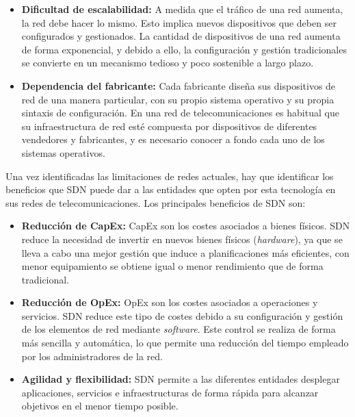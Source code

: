 \begin{itemize}
	\item \textbf{Dificultad de escalabilidad:} A medida que el tráfico de una red aumenta, la red debe hacer lo mismo. Esto implica nuevos dispositivos que deben ser configurados y gestionados. La cantidad de dispositivos de una red aumenta de forma exponencial, y debido a ello, la configuración y gestión tradicionales se convierte en un mecanismo tedioso y poco sostenible a largo plazo.
	
	\item \textbf{Dependencia del fabricante:} Cada fabricante diseña sus dispositivos de red de una manera particular, con su propio sistema operativo y su propia sintaxis de configuración. En una red de telecomunicaciones es habitual que su infraestructura de red esté compuesta por dispositivos de diferentes vendedores y fabricantes, y es necesario conocer a fondo cada uno de los sistemas operativos.
	
\end{itemize}

Una vez identificadas las limitaciones de redes actuales, hay que identificar los beneficios que SDN puede dar a las entidades que opten por esta tecnología en sus redes de telecomunicaciones. Los principales beneficios de \ac{SDN} son:

\begin{itemize}
	\item \textbf{Reducción de \ac{CapEx}:} \ac{CapEx} son los costes asociados a bienes físicos. SDN reduce la necesidad de invertir en nuevos bienes físicos (\textit{hardware}), ya que se lleva a cabo una mejor gestión que induce a planificaciones más eficientes, con menor equipamiento se obtiene igual o menor rendimiento que de forma tradicional.
	
	\item \textbf{Reducción de \ac{OpEx}:} \ac{OpEx} son los costes asociados a operaciones y servicios. SDN reduce este tipo de costes debido a su configuración y gestión de los elementos de red mediante \textit{software}. Este control se realiza de forma más sencilla y automática, lo que permite una reducción del tiempo empleado por los administradores de la red.
	
	\item \textbf{Agilidad y flexibilidad:} \ac{SDN} permite a las diferentes entidades desplegar aplicaciones, servicios e infraestructuras de forma rápida para alcanzar objetivos en el menor tiempo posible.
\end{itemize}


